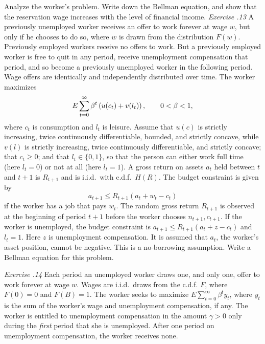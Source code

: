Analyze the worker's problem.  Write down the Bellman equation, and
show that the reservation wage increases with the level of financial income.
\medskip \noindent
{\it Exercise \the\chapternum.13}
\medskip
\noindent A previously unemployed worker receives an offer to work forever at wage $w$, but only if he chooses to do so, where
$w$ is drawn from the distribution $F(w)$.  Previously employed workers receive no offers to work.  But a previously employed  worker is free to quit in any period, receive unemployment compensation that period,
 and so become
a previously unemployed worker in the following period.    Wage offers are identically and
independently distributed over time.  The worker maximizes
$$E\sum_{t=0}^\infty {\beta}^t \left( u(c_t) + v(l_t) \right),\qquad 0<{\beta} <1,$$
where $c_t$ is consumption and $l_t$ is leisure. Assume that $u(c)$ is strictly increasing, twice continuously differentiable, bounded,
and strictly concave, while $v(l)$ is strictly increasing, twice continuously differentiable, and strictly concave;  that $c_t \geq 0$; and that $l_t  \in \{0,1\}$, so that the person can either
  work full time (here $l_t =0$) or not at all (here $l_t = 1$).
 A gross return on assets $a_t$  held
between $t$ and $t+1$  is $R_{t+1}$ and
is i.i.d.\ with
c.d.f.\  $H(R)$.  The budget constraint is given by
$$a_{t+1} \le R_{t+1} (a_t +w_t -c_t)$$
 if the worker has a job that pays $w_t$. The random gross return $R_{t+1}$ is observed at the beginning of period $t+1$ before
the worker chooses $n_{t+1}, c_{t+1}$.     If the worker is
unemployed, the budget constraint is $a_{t+1}\le R_{t+1} (a_t+z-c_t)$ and $l_t=1$.
Here $z$ is unemployment compensation.  It is assumed that  $a_t$, the worker's asset position, cannot be negative.
 This is a no-borrowing assumption.  Write a Bellman equation for
this problem.

\medskip
\noindent
{\it Exercise \the\chapternum.14} 
\medskip
\noindent Each period an unemployed worker draws one, and only
one, offer to work forever at wage $w$.  Wages are i.i.d.\ draws
from the c.d.f. $F$, where $F(0)=0$ and $F(B)=1$.    The worker seeks
to maximize $E \sum_{t=0}^\infty \beta^t y_t$, where $y_t$ is the
sum of the worker's wage and unemployment compensation, if any.
The worker is entitled to unemployment compensation in
the amount $\gamma >0$ only during
the {\it first} period that she is unemployed.  After
one period on unemployment compensation, the worker receives none.

